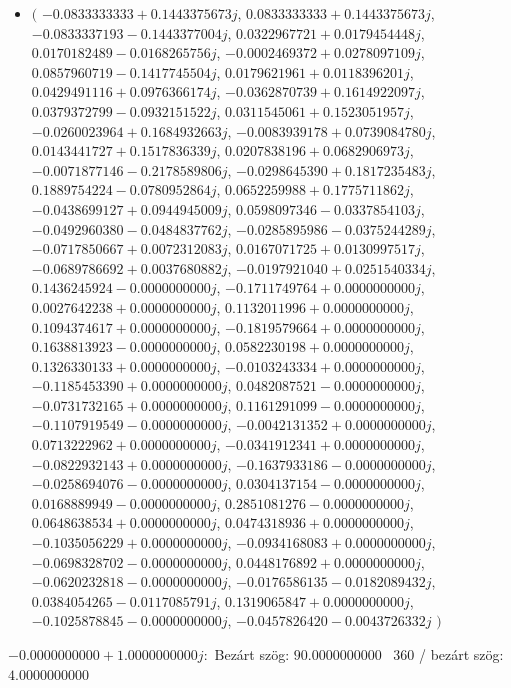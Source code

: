 \documentclass[14pt,a4paper]{article}
\begin{document}
\begin{itemize}
\item
$\big($
$-0.0833333333+0.1443375673j$, $0.0833333333+0.1443375673j$, $-0.0833337193-0.1443377004j$, $0.0322967721+0.0179454448j$, $0.0170182489-0.0168265756j$, $-0.0002469372+0.0278097109j$, $0.0857960719-0.1417745504j$, $0.0179621961+0.0118396201j$, $0.0429491116+0.0976366174j$, $-0.0362870739+0.1614922097j$, $0.0379372799-0.0932151522j$, $0.0311545061+0.1523051957j$, $-0.0260023964+0.1684932663j$, $-0.0083939178+0.0739084780j$, $0.0143441727+0.1517836339j$, $0.0207838196+0.0682906973j$, $-0.0071877146-0.2178589806j$, $-0.0298645390+0.1817235483j$, $0.1889754224-0.0780952864j$, $0.0652259988+0.1775711862j$, $-0.0438699127+0.0944945009j$, $0.0598097346-0.0337854103j$, $-0.0492960380-0.0484837762j$, $-0.0285895986-0.0375244289j$, $-0.0717850667+0.0072312083j$, $0.0167071725+0.0130997517j$, $-0.0689786692+0.0037680882j$, $-0.0197921040+0.0251540334j$, $0.1436245924-0.0000000000j$, $-0.1711749764+0.0000000000j$, $0.0027642238+0.0000000000j$, $0.1132011996+0.0000000000j$, $0.1094374617+0.0000000000j$, $-0.1819579664+0.0000000000j$, $0.1638813923-0.0000000000j$, $0.0582230198+0.0000000000j$, $0.1326330133+0.0000000000j$, $-0.0103243334+0.0000000000j$, $-0.1185453390+0.0000000000j$, $0.0482087521-0.0000000000j$, $-0.0731732165+0.0000000000j$, $0.1161291099-0.0000000000j$, $-0.1107919549-0.0000000000j$, $-0.0042131352+0.0000000000j$, $0.0713222962+0.0000000000j$, $-0.0341912341+0.0000000000j$, $-0.0822932143+0.0000000000j$, $-0.1637933186-0.0000000000j$, $-0.0258694076-0.0000000000j$, $0.0304137154-0.0000000000j$, $0.0168889949-0.0000000000j$, $0.2851081276-0.0000000000j$, $0.0648638534+0.0000000000j$, $0.0474318936+0.0000000000j$, $-0.1035056229+0.0000000000j$, $-0.0934168083+0.0000000000j$, $-0.0698328702-0.0000000000j$, $0.0448176892+0.0000000000j$, $-0.0620232818-0.0000000000j$, $-0.0176586135-0.0182089432j$, $0.0384054265-0.0117085791j$, $0.1319065847+0.0000000000j$, $-0.1025878845-0.0000000000j$, $-0.0457826420-0.0043726332j$
$\big)$
\end{itemize}
$-0.0000000000+1.0000000000j$:\
Bezárt szög: $90.0000000000$ \
360 / bezárt szög: $4.0000000000$\
\end{document}
